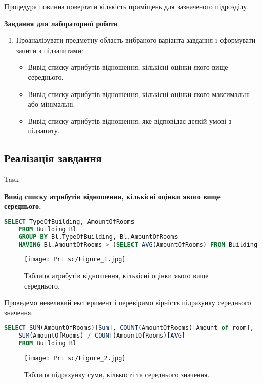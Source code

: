 \documentclass[a4paper,12pt]{article}
\newcommand{\RomanNumeralCaps}[1]{\MakeUppercase{\romannumeral #1}}
\begin{document}
	Процедура повинна повертати кількість приміщень для зазначеного підрозділу. \\
	\begin{center}
		\textbf{Завдання для лабораторної роботи}
	\end{center}
    \begin{enumerate}
        \item Проаналізувати предметну область вибраного варіанта завдання і сформувати 
        запити з підзапитами:
        \begin{itemize}
            \item Вивід списку атрибутів відношення, кількісні оцінки якого вище середнього.
            \item Вивід списку атрибутів відношення, кількісні оцінки якого максимальні або
            мінімальні.
            \item Вивід списку атрибутів відношення, яке відповідає деякій умові з підзапиту.
        \end{itemize}        
    \end{enumerate}


\newpage
	\begin{center}
		\section*{\bfseries{Реалізація завдання}}
	\end{center}
    \begin{center}
        \Large{Task \RomanNumeralCaps{1}}
    \end{center}
    \textbf{Вивід списку атрибутів відношення, кількісні оцінки якого вище середнього.}
    \begin{lstlisting}[language=SQL]
    SELECT TypeOfBuilding, AmountOfRooms
    FROM Building Bl
    GROUP BY Bl.TypeOfBuilding, Bl.AmountOfRooms
    HAVING Bl.AmountOfRooms > (SELECT AVG(AmountOfRooms) FROM Building)
    \end{lstlisting}
    \begin{figure}[h!]
		\begin{minipage}[h]{1\linewidth}
            \centering
			\texttt{[image: Prt sc/Figure\_1.jpg]}  
		\end{minipage}
		\caption{Таблиця атрибутів відношення, кількісні оцінки якого вище середнього.}
	\end{figure}
    Проведемо невеликий експеримент і перевіримо вірність підрахунку середнього значення.
    \begin{lstlisting}[language=SQL]
    SELECT SUM(AmountOfRooms)[Sum], COUNT(AmountOfRooms)[Amount of room], 
    SUM(AmountOfRooms) / COUNT(AmountOfRooms)[AVG]
    FROM Building Bl
    \end{lstlisting}
    \begin{figure}[h!]
		\begin{minipage}[h]{1\linewidth}
            \centering
			\texttt{[image: Prt sc/Figure\_2.jpg]}  
		\end{minipage}
		\caption{Таблиця підрахунку суми, кількості та середнього значення.}
	\end{figure}
\end{document}
